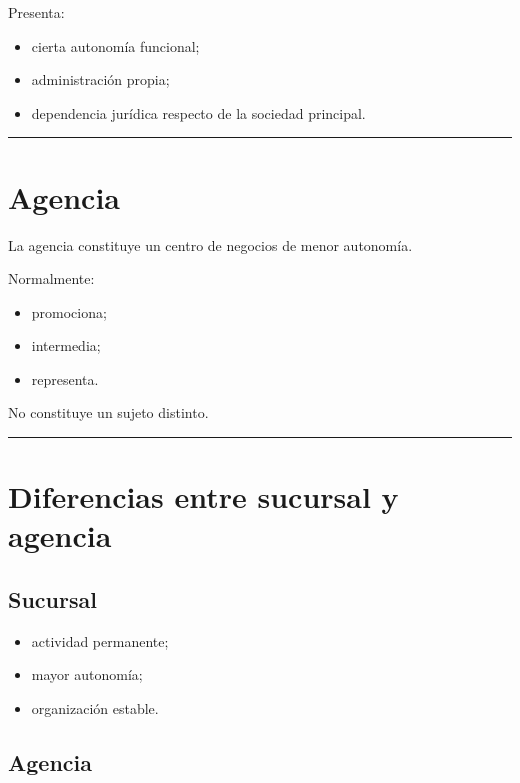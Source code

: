 \documentclass[
  spanish,
  letterpaper,
  DIV=11,
  numbers=noendperiod]{scrartcl}
\providecommand{\tightlist}{%
  \setlength{\itemsep}{0pt}\setlength{\parskip}{0pt}}
\begin{document}
Presenta:

\begin{itemize}
\tightlist
\item
  cierta autonomía funcional;
\item
  administración propia;
\item
  dependencia jurídica respecto de la sociedad principal.
\end{itemize}

\begin{center}\rule{0.5\linewidth}{0.5pt}\end{center}

\section{Agencia}\label{agencia}

La agencia constituye un centro de negocios de menor autonomía.

Normalmente:

\begin{itemize}
\tightlist
\item
  promociona;
\item
  intermedia;
\item
  representa.
\end{itemize}

No constituye un sujeto distinto.

\begin{center}\rule{0.5\linewidth}{0.5pt}\end{center}

\section{Diferencias entre sucursal y
agencia}\label{diferencias-entre-sucursal-y-agencia}

\subsection{Sucursal}\label{sucursal-1}

\begin{itemize}
\tightlist
\item
  actividad permanente;
\item
  mayor autonomía;
\item
  organización estable.
\end{itemize}

\subsection{Agencia}\label{agencia-1}
\end{document}
